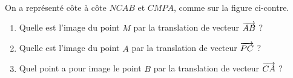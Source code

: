 \documentclass[11pt]{article}
\begin{document}
\begin{exo}~\\[2mm]
  \begin{minipage}[]{.5\textwidth}
    On a représenté côte à côte $NCAB$ et $CMPA$, comme sur la figure ci-contre.
    \begin{enumerate}
      \item Quelle est l'image du point $M$ par la translation de vecteur
        $\overrightarrow{AB}$ ?
      \item Quelle est l'image du point $A$ par la translation de vecteur
        $\overrightarrow{PC}$ ?
      \item Quel point a pour image le point $B$ par la translation de vecteur
        $\overrightarrow{CA}$ ?
    \end{enumerate}
  \end{minipage}
  \begin{minipage}[]{.5\textwidth}
    \begin{center}
    \end{center}
  \end{minipage}
\end{exo}
\end{document}
